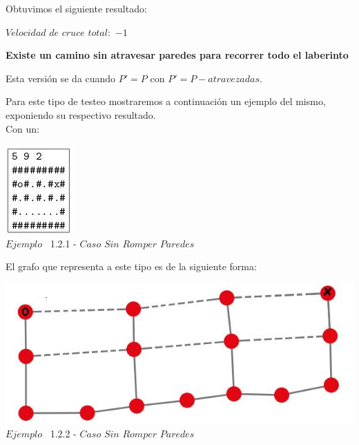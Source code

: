   Obtuvimos el siguiente resultado:

$Velocidad$ $de$ $cruce$ $total: $ $-1$\\




 \begin{center}
 \textbf{Existe un camino sin atravesar paredes para recorrer todo el laberinto}
\end{center}

Esta versi\'on se da cuando $P' = P$ con $P' = P - atravezadas$. 

Para este tipo de testeo mostraremos a continuaci\'on un ejemplo del mismo, exponiendo su respectivo resultado.\\

 
 Con un:
 
\vspace*{0.3cm} \vspace*{0.3cm}
  \begin{center}
 \includegraphics[scale=0.65]{./EJ1/ej1solucionsinpared.jpeg}
 \\{$Ejemplo$ \ 1.2.1 - $Caso$ $Sin$ $Romper$ $Paredes$}
  \end{center}
  \vspace*{0.3cm}

El grafo que representa a este tipo es de la siguiente forma:\\

\vspace*{0.3cm} \vspace*{0.3cm}
  \begin{center}
 \includegraphics[scale=0.5]{./EJ1/ej1grafosolucionsinpared.jpeg}
 \\{$Ejemplo$ \ 1.2.2 - $Caso$ $Sin$ $Romper$ $Paredes$}
  \end{center}
  \vspace*{0.3cm}

